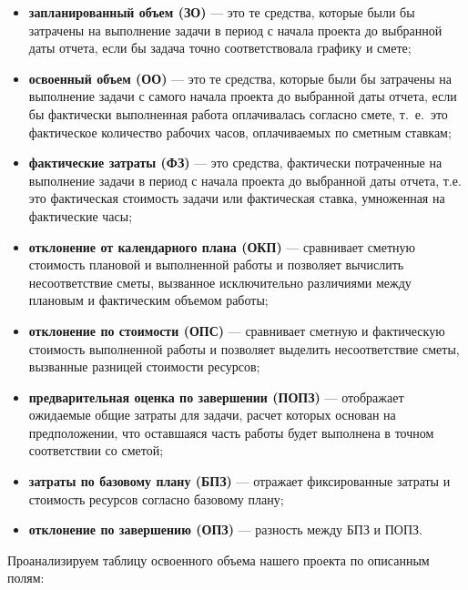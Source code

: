 \begin{itemize}
    \item \textbf{запланированный объем (ЗО)} --- это те средства, которые были бы затрачены на выполнение задачи в период с начала проекта до выбранной даты отчета, если бы задача точно соответствовала графику и смете;
    \item \textbf{освоенный объем (ОО)} --- это те средства, которые были бы затрачены на выполнение задачи с самого начала проекта до выбранной даты отчета, если бы фактически выполненная работа оплачивалась согласно смете, т.~е.~это фактическое количество рабочих часов, оплачиваемых по сметным ставкам;
    \item \textbf{фактические затраты (ФЗ)} --- это средства, фактически потраченные на выполнение задачи в период с начала проекта до выбранной даты отчета, т.е. это фактическая стоимость задачи или фактическая ставка, умноженная на фактические часы;
    \item \textbf{отклонение от календарного плана (ОКП)} --- сравнивает сметную стоимость плановой и выполненной работы и позволяет вычислить несоответствие сметы, вызванное исключительно различиями между плановым и фактическим объемом работы;
    \item \textbf{отклонение по стоимости (ОПС)} --- сравнивает сметную и фактическую стоимость выполненной работы и позволяет выделить несоответствие сметы, вызванные разницей стоимости ресурсов;
    \item \textbf{предварительная оценка по завершении (ПОПЗ)} ---  отображает ожидаемые общие затраты для задачи, расчет которых основан на предположении, что оставшаяся часть работы будет выполнена в точном соответствии со сметой;
    \item \textbf{затраты по базовому плану (БПЗ)} --- отражает фиксированные затраты и стоимость ресурсов согласно базовому плану;
    \item \textbf{отклонение по завершению (ОПЗ)} --- разность между БПЗ и ПОПЗ.
\end{itemize}

Проанализируем таблицу освоенного объема нашего проекта по описанным полям:

